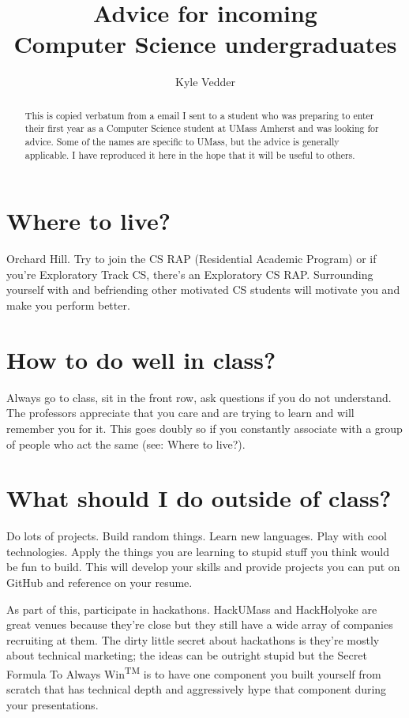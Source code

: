 \documentclass{article}
\begin{document}
\title{Advice for incoming\\Computer Science undergraduates}
\author{Kyle Vedder}

\maketitle

\begin{abstract}
This is copied verbatum from a email I sent to a student who was preparing to enter their first year as a Computer Science student at UMass Amherst and was looking for advice. Some of the names are specific to UMass, but the advice is generally applicable. I have reproduced it here in the hope that it will be useful to others.
\end{abstract}

\section{Where to live?}
Orchard Hill. Try to join the CS RAP (Residential Academic Program) or if you're Exploratory Track CS, there's an Exploratory CS RAP. Surrounding yourself with and befriending other motivated CS students will motivate you and make you perform better.

\section{How to do well in class?}
Always go to class, sit in the front row, ask questions if you do not understand. The professors appreciate that you care and are trying to learn and will remember you for it. This goes doubly so if you constantly associate with a group of people who act the same (see: Where to live?).

\section{What should I do outside of class?}
Do lots of projects. Build random things. Learn new languages. Play with cool technologies. Apply the things you are learning to stupid stuff you think would be fun to build. This will develop your skills and provide projects you can put on GitHub and reference on your resume.

As part of this, participate in hackathons. HackUMass and HackHolyoke are great venues because they're close but they still have a wide array of companies recruiting at them. The dirty little secret about hackathons is they're mostly about technical marketing; the ideas can be outright stupid but the Secret Formula To Always Win\textsuperscript{TM} is to have one component you built yourself from scratch that has technical depth and aggressively hype that component during your presentations.
\end{document}
